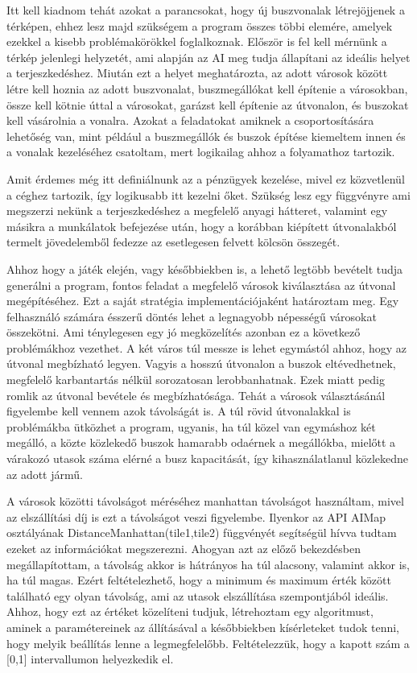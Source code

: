 Itt kell kiadnom tehát azokat a parancsokat, hogy új buszvonalak létrejöjjenek a térképen, ehhez lesz majd szükségem a program összes többi elemére, amelyek ezekkel a kisebb problémakörökkel foglalkoznak. Először is fel kell mérnünk a térkép jelenlegi helyzetét, ami alapján az AI meg tudja állapítani az ideális helyet a terjeszkedéshez. Miután ezt a helyet meghatározta, az adott városok között létre kell hoznia az adott buszvonalat, buszmegállókat kell építenie a városokban, össze kell kötnie úttal a városokat, garázst kell építenie az útvonalon, és buszokat kell vásárolnia a vonalra. Azokat a feladatokat amiknek a csoportosítására lehetőség van, mint például a buszmegállók és buszok építése kiemeltem innen és a vonalak kezeléséhez csatoltam, mert logikailag ahhoz a folyamathoz tartozik.

Amit érdemes még itt definiálnunk az a pénzügyek kezelése, mivel ez közvetlenül a céghez tartozik, így logikusabb itt kezelni őket. Szükség lesz egy függvényre ami megszerzi nekünk a terjeszkedéshez a megfelelő anyagi hátteret, valamint egy másikra a munkálatok befejezése után, hogy a korábban kiépített útvonalakból termelt jövedelemből fedezze az esetlegesen felvett kölcsön összegét.


Ahhoz hogy a játék elején, vagy későbbiekben is, a lehető legtöbb bevételt tudja generálni a program, fontos feladat a megfelelő városok kiválasztása az útvonal megépítéséhez. Ezt a saját stratégia implementációjaként határoztam meg. Egy felhasználó számára ésszerű döntés lehet a legnagyobb népességű városokat összekötni. Ami ténylegesen egy jó megközelítés azonban ez a következő problémákhoz vezethet. A két város túl messze is lehet egymástól ahhoz, hogy az útvonal megbízható legyen. Vagyis a hosszú útvonalon a buszok eltévedhetnek, megfelelő karbantartás nélkül sorozatosan lerobbanhatnak. Ezek miatt pedig romlik az útvonal bevétele és megbízhatósága. Tehát a városok választásánál figyelembe kell vennem azok távolságát is. A túl rövid útvonalakkal is problémákba ütközhet a program, ugyanis, ha túl közel van egymáshoz két megálló, a közte közlekedő buszok hamarabb odaérnek a megállókba, mielőtt a várakozó utasok száma elérné a busz kapacitását, így kihasználatlanul közlekedne az adott jármű.

A városok közötti távolságot méréséhez manhattan távolságot használtam, mivel az elszállítási díj is ezt a távolságot veszi figyelembe. Ilyenkor az API AIMap osztályának DistanceManhattan(tile1,tile2) függvényét segítségül hívva tudtam ezeket az információkat megszerezni. Ahogyan azt az előző bekezdésben megállapítottam, a távolság akkor is hátrányos ha túl alacsony, valamint akkor is, ha túl magas. Ezért feltételezhető, hogy a minimum és maximum érték között található egy olyan távolság, ami az utasok elszállítása szempontjából ideális. Ahhoz, hogy ezt az értéket közelíteni tudjuk, létrehoztam egy algoritmust, aminek a paramétereinek az állításával a későbbiekben kísérleteket tudok tenni, hogy melyik beállítás lenne a legmegfelelőbb. Feltételezzük, hogy a kapott szám a [0,1] intervallumon helyezkedik el.

